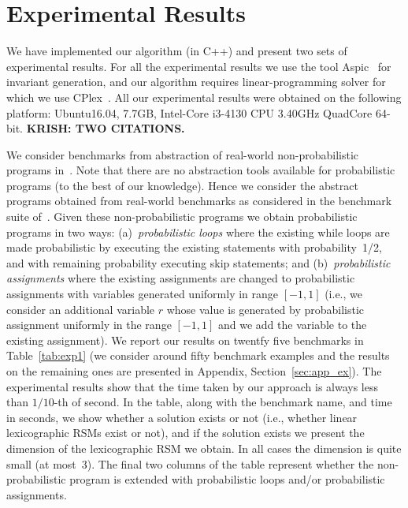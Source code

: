 
\section{Experimental Results}\label{sec:experiments}
We have implemented our algorithm (in C++) and present two sets of experimental results.
For all the experimental results we use the tool Aspic~\cite{} for invariant generation, 
and our algorithm requires linear-programming solver for which we use CPlex~\cite{}.
All our experimental results were obtained on the following platform: 
Ubuntu16.04, 7.7GB, Intel-Core i3-4130 CPU 3.40GHz QuadCore 64-bit.
{\bf KRISH: TWO CITATIONS.}


\smallskip{}
We consider benchmarks from abstraction of real-world non-probabilistic programs 
in~\cite{ADFG10:lexicographic}.
Note that there are no abstraction tools available for probabilistic programs 
(to the best of our knowledge). 
Hence we consider the abstract programs obtained from real-world benchmarks as 
considered in the benchmark suite of~\cite{ADFG10:lexicographic}.
Given these non-probabilistic programs we obtain probabilistic programs in two ways:
(a)~{\em probabilistic loops} where the existing while loops are made probabilistic 
by executing the existing statements with probability~1/2, and with remaining 
probability executing skip statements; and
(b)~{\em probabilistic assignments} where the existing assignments are changed to 
probabilistic assignments with variables generated uniformly in range $[-1,1]$ 
(i.e., we consider an additional variable $r$ whose value is generated by 
probabilistic assignment uniformly in the range $[-1,1]$ and we add the variable 
to the existing assignment).
We report our results on twentfy five benchmarks in Table~\ref{tab:exp1} (we 
consider around fifty benchmark examples and the results on the remaining ones 
are presented in Appendix, Section~\ref{sec:app_ex}).
The experimental results show that the time taken by our approach is always less 
than $1/10$-th of second.
In the table, along with the benchmark name, and time in seconds, we show 
whether a solution exists or not (i.e., whether linear lexicographic RSMs exist
or not), and if the solution exists we present the dimension of the lexicographic RSM
we obtain. In all cases the dimension is quite small (at most~3).
The final two columns of the table represent whether the non-probabilistic 
program is extended with probabilistic loops and/or probabilistic assignments.


